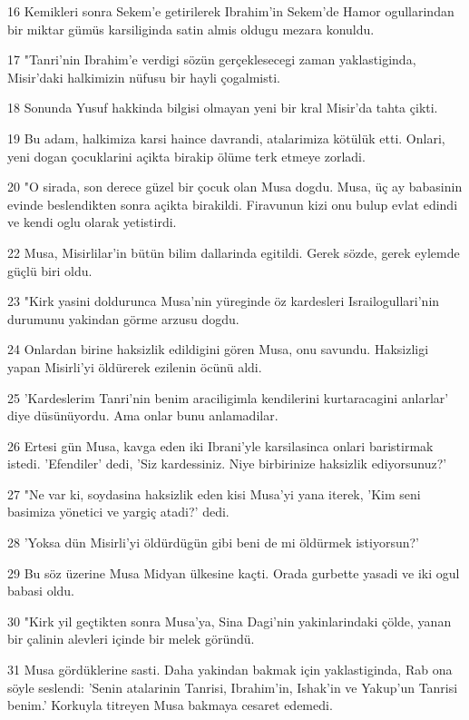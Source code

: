 \par 16 Kemikleri sonra Sekem'e getirilerek Ibrahim'in Sekem'de Hamor ogullarindan bir miktar gümüs karsiliginda satin almis oldugu mezara konuldu.
\par 17 "Tanri'nin Ibrahim'e verdigi sözün gerçeklesecegi zaman yaklastiginda, Misir'daki halkimizin nüfusu bir hayli çogalmisti.
\par 18 Sonunda Yusuf hakkinda bilgisi olmayan yeni bir kral Misir'da tahta çikti.
\par 19 Bu adam, halkimiza karsi haince davrandi, atalarimiza kötülük etti. Onlari, yeni dogan çocuklarini açikta birakip ölüme terk etmeye zorladi.
\par 20 "O sirada, son derece güzel bir çocuk olan Musa dogdu. Musa, üç ay babasinin evinde beslendikten sonra açikta birakildi. Firavunun kizi onu bulup evlat edindi ve kendi oglu olarak yetistirdi.
\par 22 Musa, Misirlilar'in bütün bilim dallarinda egitildi. Gerek sözde, gerek eylemde güçlü biri oldu.
\par 23 "Kirk yasini doldurunca Musa'nin yüreginde öz kardesleri Israilogullari'nin durumunu yakindan görme arzusu dogdu.
\par 24 Onlardan birine haksizlik edildigini gören Musa, onu savundu. Haksizligi yapan Misirli'yi öldürerek ezilenin öcünü aldi.
\par 25 'Kardeslerim Tanri'nin benim araciligimla kendilerini kurtaracagini anlarlar' diye düsünüyordu. Ama onlar bunu anlamadilar.
\par 26 Ertesi gün Musa, kavga eden iki Ibrani'yle karsilasinca onlari baristirmak istedi. 'Efendiler' dedi, 'Siz kardessiniz. Niye birbirinize haksizlik ediyorsunuz?'
\par 27 "Ne var ki, soydasina haksizlik eden kisi Musa'yi yana iterek, 'Kim seni basimiza yönetici ve yargiç atadi?' dedi.
\par 28 'Yoksa dün Misirli'yi öldürdügün gibi beni de mi öldürmek istiyorsun?'
\par 29 Bu söz üzerine Musa Midyan ülkesine kaçti. Orada gurbette yasadi ve iki ogul babasi oldu.
\par 30 "Kirk yil geçtikten sonra Musa'ya, Sina Dagi'nin yakinlarindaki çölde, yanan bir çalinin alevleri içinde bir melek göründü.
\par 31 Musa gördüklerine sasti. Daha yakindan bakmak için yaklastiginda, Rab ona söyle seslendi: 'Senin atalarinin Tanrisi, Ibrahim'in, Ishak'in ve Yakup'un Tanrisi benim.' Korkuyla titreyen Musa bakmaya cesaret edemedi.
